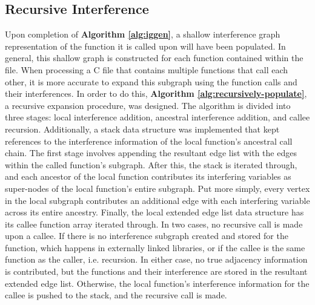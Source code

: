 \documentclass{article}
\begin{document}
\subsection{Recursive Interference}
Upon completion of \textbf{Algorithm \ref{alg:iggen}}, a shallow interference graph representation of the function it is called upon will have been populated. In general, this shallow graph is constructed for each function contained within the file. When processing a C file that contains multiple functions that call each other, it is more accurate to expand this subgraph using the function calls and their interferences. In order to do this, \textbf{Algorithm \ref{alg:recursively-populate}}, a recursive expansion procedure, was designed. The algorithm is divided into three stages: local interference addition, ancestral interference addition, and callee recursion. Additionally, a stack data structure was implemented that kept references to the interference information of the local function's ancestral call chain. The first stage involves appending the resultant edge list with the edges within the called function's subgraph. After this, the stack is iterated through, and each ancestor of the local function contributes its interfering variables as super-nodes of the local function's entire subgraph. Put more simply, every vertex in the local subgraph contributes an additional edge with each interfering variable across its entire ancestry. Finally, the local extended edge list data structure has its callee function array iterated through. In two cases, no recursive call is made upon a callee. If there is no interference subgraph created and stored for the function, which happens in externally linked libraries, or if the callee is the same function as the caller, i.e. recursion. In either case, no true adjacency information is contributed, but the functions and their interference are stored in the resultant extended edge list. Otherwise, the local function's interference information for the callee is pushed to the stack, and the recursive call is made.
\end{document}
